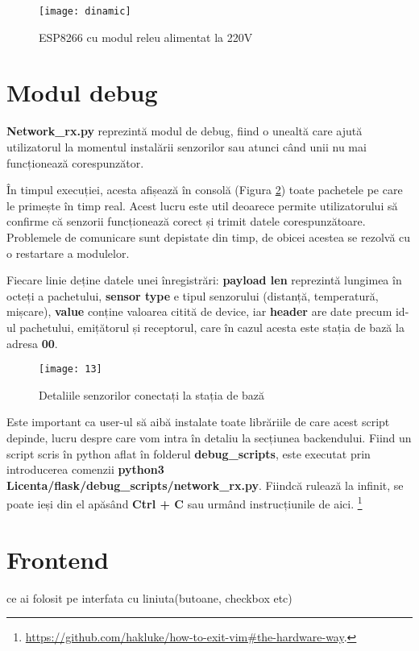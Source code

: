\begin{figure}[h]
	\centering
	\texttt{[image: dinamic]}
	\caption{ESP8266 cu modul releu alimentat la 220V}
	\label{fig:dinamic}
\end{figure}

\section{Modul debug}

\textbf{Network\_rx.py} reprezintă modul de debug, fiind o unealtă care ajută utilizatorul la momentul instalării senzorilor sau atunci când unii nu mai funcționează corespunzător.

În timpul execuției, acesta afișează în consolă (Figura \ref{fig:13}) toate pachetele pe care le primește în timp real. Acest lucru este util deoarece permite utilizatorului să confirme că senzorii funcționează corect și trimit datele corespunzătoare. Problemele de comunicare sunt depistate din timp, de obicei acestea se rezolvă cu o restartare a modulelor.

Fiecare linie deține datele unei înregistrări: \textbf{payload len} reprezintă lungimea în octeți a pachetului, \textbf{sensor type} e tipul senzorului (distanță, temperatură, mișcare), \textbf{value} conține valoarea citită de device, iar \textbf{header} are date precum id-ul pachetului, emițătorul și receptorul, care în cazul acesta este stația de bază la adresa \textbf{00}.

\begin{figure}[h]
	\centering
	\texttt{[image: 13]}
	\caption{Detaliile senzorilor conectați la stația de bază}
	\label{fig:13}
\end{figure}

Este important ca user-ul să aibă instalate toate librăriile de care acest script depinde, lucru despre care vom intra în detaliu la secțiunea backendului. Fiind un script scris în python aflat în folderul \textbf{debug\_scripts}, este executat prin introducerea comenzii \textbf{python3 Licenta/flask/debug\_scripts/network\_rx.py}. Fiindcă rulează la infinit, se poate ieși din el apăsând \textbf{Ctrl + C} sau urmând instrucțiunile de aici. \footnote{\url{https://github.com/hakluke/how-to-exit-vim\#the-hardware-way}.}

\newpage

\section{Frontend}
ce ai folosit pe interfata cu liniuta(butoane, checkbox etc)

